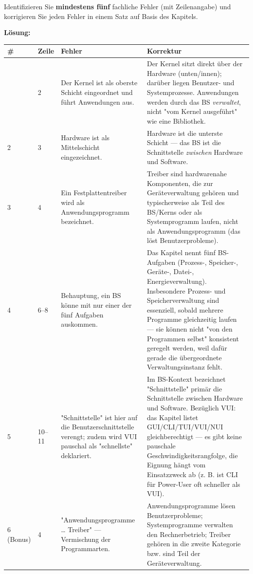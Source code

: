 \documentclass[11pt, a4paper]{article}
\begin{document}
Identifizieren Sie \textbf{mindestens fünf} fachliche Fehler (mit Zeilenangabe) und korrigieren Sie jeden Fehler in einem Satz auf Basis des Kapitels.


\textbf{Lösung:}



{\small
\begin{tabularx}{\linewidth}{XXXX}
\hline
\rowcolor{tableheadbg}
{\color{white}\textbf{\#}} & {\color{white}\textbf{Zeile}} & {\color{white}\textbf{Fehler}} & {\color{white}\textbf{Korrektur}} \\[2pt]
\hline
\endhead
\hline
\endfoot
1 & 2 & Der Kernel ist als oberste Schicht eingeordnet und führt Anwendungen aus. & Der Kernel sitzt direkt über der Hardware (unten/innen); darüber liegen Benutzer- und Systemprozesse. Anwendungen werden durch das BS \textit{verwaltet}, nicht "vom Kernel ausgeführt" wie eine Bibliothek. \\
2 & 3 & Hardware ist als Mittelschicht eingezeichnet. & Hardware ist die unterste Schicht — das BS ist die Schnittstelle \textit{zwischen} Hardware und Software. \\
3 & 4 & Ein Festplattentreiber wird als Anwendungsprogramm bezeichnet. & Treiber sind hardwarenahe Komponenten, die zur Geräteverwaltung gehören und typischerweise als Teil des BS/Kerns oder als Systemprogramm laufen, nicht als Anwendungsprogramm (das löst Benutzerprobleme). \\
4 & 6–8 & Behauptung, ein BS könne mit nur einer der fünf Aufgaben auskommen. & Das Kapitel nennt fünf BS-Aufgaben (Prozess-, Speicher-, Geräte-, Datei-, Energieverwaltung). Insbesondere Prozess- und Speicherverwaltung sind essenziell, sobald mehrere Programme gleichzeitig laufen — sie können nicht "von den Programmen selbst" konsistent geregelt werden, weil dafür gerade die übergeordnete Verwaltungsinstanz fehlt. \\
5 & 10–11 & "Schnittstelle" ist hier auf die Benutzerschnittstelle verengt; zudem wird VUI pauschal als "schnellste" deklariert. & Im BS-Kontext bezeichnet "Schnittstelle" primär die Schnittstelle zwischen Hardware und Software. Bezüglich VUI: das Kapitel listet GUI/CLI/TUI/VUI/NUI gleichberechtigt — es gibt keine pauschale Geschwindigkeitsrangfolge, die Eignung hängt vom Einsatzzweck ab (z. B. ist CLI für Power-User oft schneller als VUI). \\
6 (Bonus) & 4 & "Anwendungsprogramme … Treiber" — Vermischung der Programmarten. & Anwendungsprogramme lösen Benutzerprobleme; Systemprogramme verwalten den Rechnerbetrieb; Treiber gehören in die zweite Kategorie bzw. sind Teil der Geräteverwaltung. \\
\end{tabularx}
}
\end{document}

